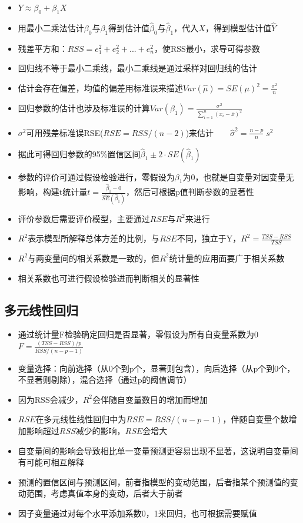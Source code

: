 \documentclass[
]{book}
\providecommand{\tightlist}{%
  \setlength{\itemsep}{0pt}\setlength{\parskip}{0pt}}
\begin{document}
\begin{itemize}
\tightlist
\item
  \(Y \approx \beta_0 + \beta_1 X\)
\item
  用最小二乘法估计\(\beta_0\)与\(\beta_1\)得到估计值\(\hat \beta_0\)与\(\hat \beta_1\)，代入\(X\)，得到模型估计值\(\hat Y\)
\item
  残差平方和：\(RSS = e_1^2 + e_2^2 + ... + e_n^2\)，使RSS最小，求导可得参数
\item
  回归线不等于最小二乘线，最小二乘线是通过采样对回归线的估计
\item
  估计会存在偏差，均值的偏差用标准误来描述\(Var(\hat \mu) = SE(\mu)^2 = \frac{\sigma^2}{n}\)
\item
  回归参数的估计也涉及标准误的计算\(Var(\beta_{1}) = \frac{\sigma^2}{\sum_{i=1}^n{(x_i - \bar{x})^2}}\)
\item
  \(\sigma^2\)可用残差标准误RSE(\(RSE = RSS/(n − 2)\))来估计\(\qquad\hat\sigma^2 = \frac{n-p}{n}\;s^2\)
\item
  据此可得回归参数的95\%置信区间\(\hat \beta_1 ± 2 \cdot SE(\hat \beta_1)\)
\item
  参数的评价可通过假设检验进行，零假设为\(\beta_1\)为0，也就是自变量对因变量无影响，构建t统计量\(t = \frac{\hat \beta_1 - 0}{\hat {SE}(\hat \beta_1)}\)，然后可根据p值判断参数的显著性
\item
  评价参数后需要评价模型，主要通过\(RSE\)与\(R^2\)来进行
\item
  \(R^2\)表示模型所解释总体方差的比例，与\(RSE\)不同，独立于Y，\(R^2 = \frac{TSS - RSS}{TSS}\)
\item
  \(R^2\)与两变量间的相关系数是一致的，但\(R^2\)统计量的应用面要广于相关系数
\item
  相关系数也可进行假设检验进而判断相关的显著性
\end{itemize}

\hypertarget{ux591aux5143ux7ebfux6027ux56deux5f52}{%
\subsection{多元线性回归}\label{ux591aux5143ux7ebfux6027ux56deux5f52}}

\begin{itemize}
\tightlist
\item
  通过统计量F检验确定回归是否显著，零假设为所有自变量系数为0 \(F = \frac{(TSS - RSS)/p}{RSS/(n-p-1)}\)
\item
  变量选择：向前选择（从0个到p个，显著则包含），向后选择（从p个到0个，不显著则剔除），混合选择（通过p的阈值调节）
\item
  因为RSS会减少，\(R^2\)会伴随自变量数目的增加而增加
\item
  \(RSE\)在多元线性线性回归中为\(RSE = RSS/(n − p - 1)\)，伴随自变量个数增加影响超过\(RSS\)减少的影响，\(RSE\)会增大
\item
  自变量间的影响会导致相比单一变量预测更容易出现不显著，这说明自变量间有可能可相互解释
\item
  预测的置信区间与预测区间，前者指模型的变动范围，后者指某个预测值的变动范围，考虑真值本身的变动，后者大于前者
\item
  因子变量通过对每个水平添加系数0，1来回归，也可根据需要赋值
\end{itemize}
\end{document}
